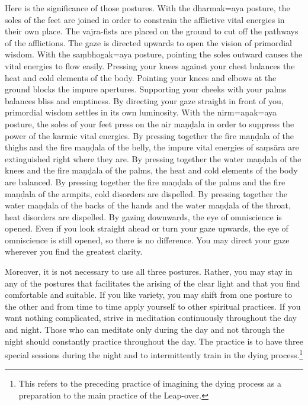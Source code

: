 \documentclass[11pt,twocolumn]{article}
\begin{document}
Here is the significance of those postures. With the dharmak\a={a}ya
posture, the soles of the feet are joined in order to constrain the
afflictive vital energies in their own place. The vajra\hyp{}fists are
placed on the ground to cut off the pathways of the afflictions. The
gaze is directed upwards to open the vision of primordial wisdom. With
the sa\d{m}bhogak\a={a}ya posture, pointing the soles outward causes
the vital energies to flow easily. Pressing your knees against your
chest balances the heat and cold elements of the body. Pointing your
knees and elbows at the ground blocks the impure apertures. Supporting
your cheeks with your palms balances bliss and emptiness. By directing
your gaze straight in front of you, primordial wisdom settles in its
own luminosity. With the nirm\a={a}\d{n}ak\a={a}ya posture, the soles
of your feet press on the air ma\d{n}\d{d}ala in order to suppress the
power of the karmic vital energies. By pressing together the fire
ma\d{n}\d{d}ala of the thighs and the fire ma\d{n}\d{d}ala of the
belly, the impure vital energies of sa\d{m}s\={a}ra are extinguished
right where they are. By pressing together the water ma\d{n}\d{d}ala
of the knees and the fire ma\d{n}\d{d}ala of the palms, the heat and
cold elements of the body are balanced. By pressing together the fire
ma\d{n}\d{d}ala of the palms and the fire ma\d{n}\d{d}ala of the
armpits, cold disorders are dispelled. By pressing together the water
ma\d{n}\d{d}ala of the backs of the hands and the water
ma\d{n}\d{d}ala of the throat, heat disorders are dispelled. By gazing
downwards, the eye of omniscience is opened. Even if you look straight
ahead or turn your gaze upwards, the eye of omniscience is still
opened, so there is no difference. You may direct your gaze wherever
you find the greatest clarity.

Moreover, it is not necessary to use all three postures. Rather, you
may stay in any of the postures that facilitates the arising of the
clear light and that you find comfortable and suitable. If you like
variety, you may shift from one posture to the other and from time to
time apply yourself to other spiritual practices. If you want nothing
complicated, strive in meditation continuously throughout the day and
night. Those who can meditate only during the day and not through the
night should constantly practice throughout the day. The practice is
to have three special sessions during the night and to intermittently
train in the dying process.\footnote{This refers to the preceding
  practice of imagining the dying process as a preparation to the main
  practice of the Leap\hyp{}over.}
\end{document}
